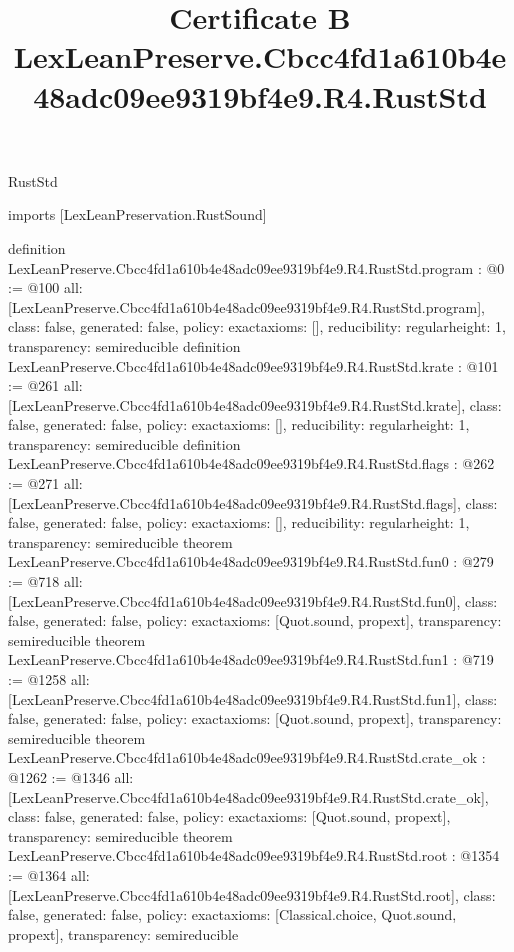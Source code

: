 \begin{lexlean}{RustStd}
\title{Certificate B LexLeanPreserve.Cbcc4fd1a610b4e48adc09ee9319bf4e9.R4.RustStd}
\begin{coremodule}
imports [LexLeanPreservation.RustSound]

definition LexLeanPreserve.Cbcc4fd1a610b4e48adc09ee9319bf4e9.R4.RustStd.program : @0 := @100 {
  all: [LexLeanPreserve.Cbcc4fd1a610b4e48adc09ee9319bf4e9.R4.RustStd.program],
  class: false,
  generated: false,
  policy: exact{axioms: []},
  reducibility: regular{height: 1},
  transparency: semireducible
}
definition LexLeanPreserve.Cbcc4fd1a610b4e48adc09ee9319bf4e9.R4.RustStd.krate : @101 := @261 {
  all: [LexLeanPreserve.Cbcc4fd1a610b4e48adc09ee9319bf4e9.R4.RustStd.krate],
  class: false,
  generated: false,
  policy: exact{axioms: []},
  reducibility: regular{height: 1},
  transparency: semireducible
}
definition LexLeanPreserve.Cbcc4fd1a610b4e48adc09ee9319bf4e9.R4.RustStd.flags : @262 := @271 {
  all: [LexLeanPreserve.Cbcc4fd1a610b4e48adc09ee9319bf4e9.R4.RustStd.flags],
  class: false,
  generated: false,
  policy: exact{axioms: []},
  reducibility: regular{height: 1},
  transparency: semireducible
}
theorem LexLeanPreserve.Cbcc4fd1a610b4e48adc09ee9319bf4e9.R4.RustStd.fun0 : @279 := @718 {
  all: [LexLeanPreserve.Cbcc4fd1a610b4e48adc09ee9319bf4e9.R4.RustStd.fun0],
  class: false,
  generated: false,
  policy: exact{axioms: [Quot.sound, propext]},
  transparency: semireducible
}
theorem LexLeanPreserve.Cbcc4fd1a610b4e48adc09ee9319bf4e9.R4.RustStd.fun1 : @719 := @1258 {
  all: [LexLeanPreserve.Cbcc4fd1a610b4e48adc09ee9319bf4e9.R4.RustStd.fun1],
  class: false,
  generated: false,
  policy: exact{axioms: [Quot.sound, propext]},
  transparency: semireducible
}
theorem LexLeanPreserve.Cbcc4fd1a610b4e48adc09ee9319bf4e9.R4.RustStd.crate_ok : @1262 := @1346 {
  all: [LexLeanPreserve.Cbcc4fd1a610b4e48adc09ee9319bf4e9.R4.RustStd.crate_ok],
  class: false,
  generated: false,
  policy: exact{axioms: [Quot.sound, propext]},
  transparency: semireducible
}
theorem LexLeanPreserve.Cbcc4fd1a610b4e48adc09ee9319bf4e9.R4.RustStd.root : @1354 := @1364 {
  all: [LexLeanPreserve.Cbcc4fd1a610b4e48adc09ee9319bf4e9.R4.RustStd.root],
  class: false,
  generated: false,
  policy: exact{axioms: [Classical.choice, Quot.sound, propext]},
  transparency: semireducible
}


\end{coremodule}
\end{lexlean}
